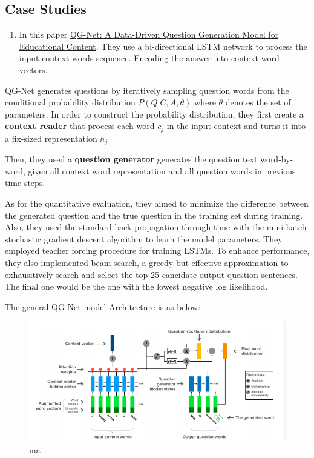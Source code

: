 \documentclass[]{book}
\providecommand{\tightlist}{%
  \setlength{\itemsep}{0pt}\setlength{\parskip}{0pt}}
\theoremstyle{definition}
\theoremstyle{definition}
\theoremstyle{definition}
\theoremstyle{remark}
\begin{document}
\subsection{Case Studies}\label{case-studies}

\begin{enumerate}
\def\labelenumi{\arabic{enumi}.}
\tightlist
\item
  In this paper
  \href{http://www.princeton.edu/~shitingl/papers/18l@s-qgen.pdf}{QG-Net:
  A Data-Driven Question Generation Model for Educational Content}. They
  use a bi-directional LSTM network to process the input context words
  sequence. Encoding the answer into context word vectors.
\end{enumerate}

QG-Net generates questions by iteratively sampling question words from
the conditional probability distribution \(P(Q|C,A,\theta)\) where
\(\theta\) denotes the set of parameters. In order to construct the
probability distribution, they first create a \textbf{context reader}
that process each word \(c_j\) in the input context and turns it into a
fix-sized representation \(h_j\)

Then, they used a \textbf{question generator} generates the question
text word-by-word, given all context word representation and all
question words in previous time steps.

As for the quantitative evaluation, they aimed to minimize the
difference between the generated question and the true question in the
training set during training. Also, they used the standard
back-propagation through time with the mini-batch stochastic gradient
descent algorithm to learn the model parameters. They employed teacher
forcing procedure for training LSTMs. To enhance performance, they also
implemented beam search, a greedy but effective approximation to
exhausitively search and select the top 25 cancidate output question
sentences. The final one would be the one with the lowest negative log
likelihood.

The general QG-Net model Architecture is as below:

\begin{figure}
\centering
\includegraphics{img/qgnet.png}
\caption{ma}
\end{figure}
\end{document}
